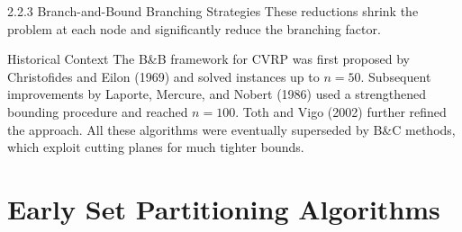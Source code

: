 \documentclass[aspectratio=169,10pt]{beamer}
\begin{document}
\begin{frame}[allowframebreaks]{2.2.3 Branch-and-Bound Branching Strategies}
  These reductions shrink the problem at each node and significantly reduce
  the branching factor.

  \bigskip
  \begin{block}{Historical Context}
    The B\&B framework for CVRP was first proposed by Christofides and Eilon
    (1969) and solved instances up to $n=50$. Subsequent improvements by
    Laporte, Mercure, and Nobert (1986) used a strengthened bounding procedure
    and reached $n=100$. Toth and Vigo (2002) further refined the approach.
    All these algorithms were eventually superseded by B\&C methods, which
    exploit cutting planes for much tighter bounds.
  \end{block}
\end{frame}

\section{Early Set Partitioning Algorithms}
\end{document}

